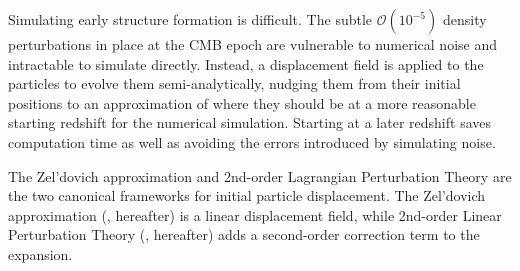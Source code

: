 

Simulating early structure formation is difficult.  The subtle $\mathcal{O}(10^{-5})$ density perturbations in place at the CMB epoch are vulnerable to numerical noise and intractable to simulate directly.  Instead, a displacement field is applied to the particles to evolve them semi-analytically, nudging them from their initial positions to an approximation of where they should be at a more reasonable starting redshift for the numerical simulation.  Starting at a later redshift saves computation time as well as avoiding the errors introduced by simulating noise.






The Zel'dovich approximation \citep{1970A&A.....5...84Z, 1983MNRAS.204..891K, 1985ApJS...57..241E} and 2nd-order Lagrangian Perturbation Theory \citep{1994MNRAS.267..811B, 1994A&A...288..349B, 1995A&A...296..575B, 1998MNRAS.299.1097S, 2005ApJ...634..728S, 2006MNRAS.373..369C, 2010MNRAS.403.1859J} are the two canonical frameworks for initial particle displacement.  The Zel'dovich approximation (\za, hereafter) is a linear displacement field, while 2nd-order Linear Perturbation Theory (\lpt, hereafter) adds a second-order correction term to the expansion.

